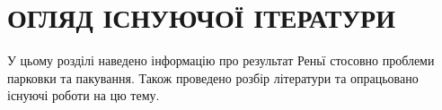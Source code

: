 \chapter{ОГЛЯД ІСНУЮЧОЇ ІТЕРАТУРИ} 

\hspace{10pt}

У цьому розділі наведено інформацію про результат Реньї стосовно проблеми парковки та пакування. Також проведено розбір літератури та опрацьовано існуючі роботи на цю тему.






	